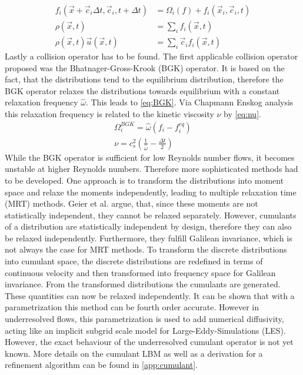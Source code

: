 \begin{align}
	f_i(\vec{x} + \vec{c}_i \Delta t, \vec{c}_i, t+\Delta t ) &= \Omega_i(f) + f_i(\vec{x}_i, \vec{c}_i, t) \label{eq:LBE} \\
	\rho(\vec{x}, t) &= \sum_i f_i(\vec{x}, t) \label{eq:density_d} \\
	\rho(\vec{x}, t) \vec{u}(\vec{x}, t) &= \sum_i \vec{c}_i f_i(\vec{x}, t) \label{eq:vel_d}
\end{align}
Lastly a collision operator has to be found. The first applicable collision operator proposed was the Bhatnager-Gross-Krook (BGK) operator. It is based on the fact, that the distributions tend to the equilibrium distribution, therefore the BGK operator relaxes the distributions towards equilibrium with a constant relaxation frequency $\hat{\omega}$. This leads to \eqref{eq:BGK}. Via Chapmann Enskog analysis this relaxation frequency is related to the kinetic viscosity $\nu$ by \eqref{eq:nu}. \cite[p. 98-100, 112]{kruger_lattice_2017}
\begin{align}
	\Omega^{BGK}_i = \hat{\omega}\left(f_i - f_i^{eq} \right) \label{eq:BGK} \\
	\nu = c_s^2\left(\frac{1}{\hat{\omega}} - \frac{\Delta t }{2} \right) \label{eq:nu}
\end{align}
While the BGK operator is sufficient for low Reynolds number flows, it becomes unstable at higher Reynolds numbers. Therefore more sophisticated methods had to be developed. One approach is to transform the distributions into moment space and relaxe the moments independently, leading to multiple relaxation time (MRT) methods. Geier et al. argue, that, since these moments are not statistically independent, they cannot be relaxed separately. However, cumulants of a distribution are statistically independent by design, therefore they can also be relaxed independently. Furthermore, they fulfill Galilean invariance, which is not always the case for MRT methods. To transform the discrete distributions into cumulant space, the discrete distributions are redefined in terms of continuous velocity and then transformed into frequency space for Galilean invariance. From the transformed distributions the cumulants are generated. These quantities can now be relaxed independently. It can be shown that with a parametrization this method can be fourth order accurate\cite{geier_fourth_2018}. However in underresolved flows, this parametrization is used to add numerical diffusivity, acting like an implicit subgrid scale model for Large-Eddy-Simulations (LES)\cite{asmuth_actuator_2020}. However, the exact behaviour of the underresolved cumulant operator is not yet known. More details on the cumulant LBM as well as a derivation for a refinement algorithm can be found in \autoref{app:cumulant}. \\
